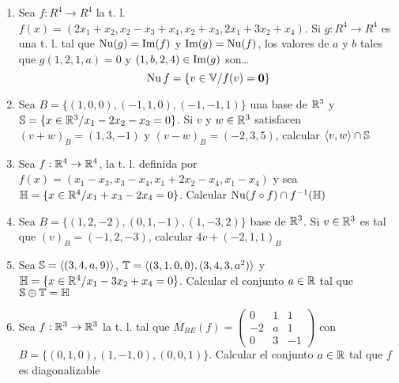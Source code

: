 \documentclass[../practica.root.tex]{subfiles}
\begin{document}
\begin{enumerate}
    \item Sea $f : R^4 \to R^4$ la t. l. $f(x) = (2x_1+x_2, x_2-x_3+x_4, x_2+x_3, 2x_1+3x_2+x_4)$. Si $g : R^4 \to R^4$ es una t. l. tal que $\Nu(g) = \Img(f)$ y $\Img(g) = \Nu(f)$, los valores de $a$ y $b$ tales que $g(1,2,1,a) = 0$ y $(1,b,2,4) \in \Img(g)$ son\dots
          \[ \Nu f = \{ v \in \V / f(v) = \0 \} \]

    \item Sea $B = \{(1,0,0), (-1,1,0), (-1,-1,1)\}$ una base de $\R^3$ y $\S = \{x \in \R^3 / x_1 - 2x_2 - x_3 = 0\}$. Si $v$ y $w \in \R^3$ satisfacen $(v + w)_B = (1,3,-1)$ y $(v - w)_B = (-2,3,5)$, calcular $\langle v, w\rangle \cap \S$

    \item Sea $f : \R^4 \to \R^4$, la t. l. definida por $f(x) = (x_1 - x_3, x_3 - x_4, x_1 + 2x_2 - x_4, x_1 - x_4)$ y sea $\H = \{x \in \R^4 / x_1 + x_3 - 2x_4 = 0\}$. Calcular $\Nu(f \circ f)\cap f^{-1}(\H)$

    \item Sea $B = \{(1,2,-2), (0,1,-1), (1,-3,2)\}$ base de $\R^3$. Si $v \in \R^3$ es tal que $(v)_B = (-1,2,-3)$, calcular $4v + (-2,1,1)_B$

    \item Sea $\S = \langle(3,4,a,9)\rangle$, $\T = \langle(3,1,0,0),(3,4,3,a^2)\rangle$ y $\H = \{x \in \R^4 / x_1 - 3x_2 + x_4 = 0\}$. Calcular el conjunto $a \in \R$ tal que $\S \oplus \T = \H$

    \item Sea $f : \R^3 \to \R^3$ la t. l. tal que $M_{BE}(f) = \begin{pmatrix}
              0 & 1 & 1 \\ -2 & a & 1 \\ 0 & 3 & -1
          \end{pmatrix}$ con $B = \{(0,1,0),(1,-1,0),(0,0,1)\}$. Calcular el conjunto $a \in \R$ tal que $f$ es diagonalizable
\end{enumerate}
\end{document}
